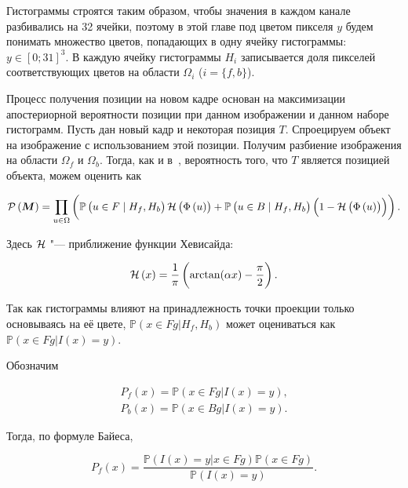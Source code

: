 Гистограммы строятся таким образом, чтобы значения в каждом канале разбивались
на 32 ячейки, поэтому в этой главе под цветом пикселя $y$ будем понимать
множество цветов, попадающих в одну ячейку гистограммы: $y \in [0; 31]^3$.
В каждую ячейку гистограммы $H_i$ записывается доля пикселей соответствующих
цветов на области $\Omega_i$ ($i = \{f, b\}$).

Процесс получения позиции на новом кадре основан на максимизации апостериорной
вероятности позиции при данном изображении и данном наборе гистограмм.
Пусть дан новый кадр и некоторая позиция $T$.
Спроецируем объект на изображение с использованием этой позиции.
Получим разбиение изображения на области $\Omega_f$ и $\Omega_b$.
Тогда, как и в~\cite{Hexner2016}, вероятность того, что $T$ является позицией
объекта, можем оценить как

\newcommand{\Hf}{\ensuremath{H_f}}
\newcommand{\Hb}{\ensuremath{H_b}}
\newcommand{\uvec}{\ensuremath{\vect{u}}}
\newcommand{\hedist}{\ensuremath{\HeX{\CDistX{\uvec}}}}

\begin{equation}
\label{eqn:pos_prob}
    \ProbMainX{\Pose} = \prod\limits_{\uvec \in \ImgDom} \left(
        \ProbX{\uvec \in \FgTrue \mid \Hf, \Hb} \hedist
        + \ProbX{\uvec \in \BgTrue \mid \Hf, \Hb} \left( 1 - \hedist \right)
    \right)
\text{.}
\end{equation}

Здесь $\mathcal{H}$ "--- приближение функции Хевисайда:

\begin{equation}
\label{eqn:heaviside}
    \mathcal{H} \left( x \right) = \frac{1}{\pi} \left( \arctan(\alpha x) - \frac{\pi}{2} \right)
\text{.}
\end{equation}

Так как гистограммы влияют на принадлежность точки проекции только основываясь
на её цвете,
$\mathbb{P}(x \in Fg | H_f, H_b)$
может оцениваться как
$\mathbb{P}(x \in Fg | I(x) = y)$.

Обозначим

\begin{equation}
\label{eqn:Pfx}
\begin{array}{c}
P_f(x) = \mathbb{P}(x \in Fg | I(x) = y) \text{,} \\
P_b(x) = \mathbb{P}(x \in Bg | I(x) = y) \text{.}
\end{array}
\end{equation}

Тогда, по формуле Байеса,

\begin{equation}
\label{eqn:Bayes}
P_f(x)= \frac{\mathbb{P}(I(x) = y | x \in Fg) 
\mathbb{P}(x \in Fg)}{\mathbb{P}(I(x) = y)}
\text{.}
\end{equation}

